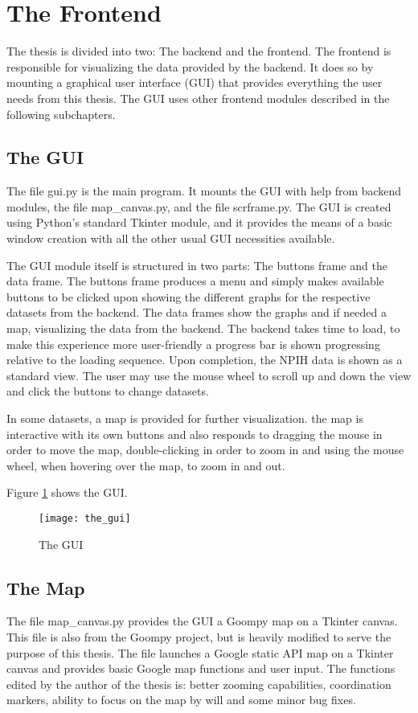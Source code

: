 \section{The Frontend}
The thesis is divided into two: The backend and the frontend. The frontend is responsible for visualizing the data provided by the backend. It does so by mounting a graphical user interface (GUI) that provides everything the user needs from this thesis. The GUI uses other frontend modules described in the following subchapters.



\subsection{The GUI}
The file gui.py is the main program. It mounts the GUI with help from  backend modules, the file map\_canvas.py, and the file scrframe.py. The GUI is created using Python's standard Tkinter module, and it provides the means of a basic window creation with all the other usual GUI necessities available. 

The GUI module itself is structured in two parts: The buttons frame and the data frame. The buttons frame produces a menu and simply makes available buttons to be clicked upon showing the different graphs for the respective datasets from the backend. The data frames show the graphs and if needed a map, visualizing the data from the backend. The backend takes time to load, to make this experience more user-friendly a progress bar is shown progressing relative to the loading sequence. Upon completion, the NPIH data is shown as a standard view. The user may use the mouse wheel to scroll up and down the view and click the buttons to change datasets. 

In some datasets, a map is provided for further visualization. the map is interactive with its own buttons and also responds to dragging the mouse in order to move the map, double-clicking in order to zoom in and using the mouse wheel, when hovering over the map, to zoom in and out.

Figure \ref{fig:the_gui} shows the GUI.

\begin{figure}[ht]
\texttt{[image: the\_gui]}
\centering
\caption{The GUI}
\label{fig:the_gui}
\end{figure}



\subsection{The Map}
The file map\_canvas.py provides the GUI a Goompy\cite{goompy} map on a Tkinter canvas. This file is also from the Goompy project, but is heavily modified to serve the purpose of this thesis. The file launches a Google static API map on a Tkinter canvas and provides basic Google map functions and user input. The functions edited by the author of the thesis is: better zooming capabilities, coordination markers, ability to focus on the map by will and some minor bug fixes.

